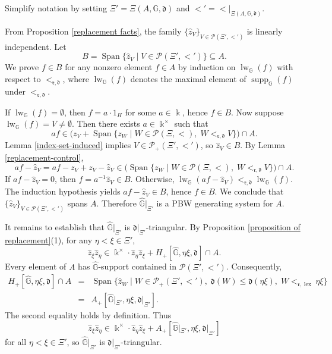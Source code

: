 \documentclass{article}
\makeatletter
\renewenvironment{proof}[1][\proofname]{\par
	\pushQED{\qed}%
	\normalfont \topsep6\p@\@plus6\p@\relax
	\trivlist
	\item[\hskip\labelsep
	\bfseries
	#1\@addpunct{.}]\ignorespaces
}{%
	\popQED\endtrivlist\@endpefalse
}
\theoremstyle{plain}
\theoremstyle{definition}
\numberwithin{equation}{section}
\DeclareMathOperator{\Span}{Span}
\DeclareMathOperator{\lex}{lex}
\DeclareMathOperator{\supp}{supp}
\newcommand{\GG}{\mathbb{G}}
\newcommand{\dd}{\mathfrak{d}}
\newcommand{\rr}{\mathfrak{r}}
\makeatother
\begin{document}
	\begin{proof}[Proof of Theorem \ref{PBW-sub-hereditary}]
		Simplify notation by setting $\Xi'=\Xi(A,\GG,\dd)$ and $<'={<}|_{\Xi(A,\GG,\dd)}$.
		
		From Proposition \ref{replacement facts}, the family $\{\hat{z}_{V}\}_{V\in \mathcal{P}(\Xi', <')}$ is linearly independent. Let $$B=\Span\{\hat{z}_{V}\mid V\in \mathcal{P}(\Xi', <')\}\subseteq A.$$ We prove $f\in B$ for any nonzero element $f\in A$ by induction on $\operatorname{lw}_{\GG}(f)$ with respect to $<_{\rr,\dd}$, where $\operatorname{lw}_{\GG}(f)$ denotes the maximal element of $\supp_{\GG}(f)$ under $<_{\rr,\dd}$.
		
		If $\operatorname{lw}_{\GG}(f)=\emptyset$, then $f=a\cdot 1_{H}$ for some $a\in \Bbbk$, hence $f\in B$. Now suppose $\operatorname{lw}_{\GG}(f)= V \neq \emptyset$. Then there exists $a\in \Bbbk^{\times}$ such that
		\[
		a f\in \big ( z_{V} + \Span\{z_{W} \mid W\in \mathcal{P}(\Xi, <),\; W<_{\rr,\dd} V\} \big) \cap A.
		\]
		Lemma \ref{index-set-induced} implies $V\in \mathcal{P}_{+}(\Xi', <')$, so $\hat{z}_{V}\in B$. By Lemma \ref{replacement-control},
		\[
		af - \hat{z}_{V} =af-z_{V} +z_{V}- \hat{z}_{V} \in \big ( \Span\{z_{W} \mid W\in \mathcal{P}(\Xi, <),\; W<_{\rr,\dd} V\} \big) \cap A.
		\]
		If $af - \hat{z}_{V}=0$, then $f= a^{-1}\hat{z}_{V}\in B$. Otherwise, $\operatorname{lw}_{\GG}(af - \hat{z}_{V})  <_{\rr,\dd} \operatorname{lw}_{\GG}(f)$. The induction hypothesis yields $af - \hat{z}_{V} \in B$, hence $f\in B$. We conclude that $\{\hat{z}_{V}\}_{V\in \mathcal{P}(\Xi', <')}$ spans $A$. Therefore $\hat{\GG}|_{\Xi'}$ is a PBW generating system for $A$.
		
		It remains to establish that $\hat{\GG}|_{\Xi'}$ is $\dd|_{\Xi'}$-triangular. By Proposition \ref{proposition of replacement}(1), for any $\eta<\xi\in\Xi'$,
		\[
		\hat{z}_\xi\hat{z}_\eta \in  \Bbbk^{\times}\cdot\hat{z}_\eta\hat{z}_\xi
		+ H_{+}[\hat{\GG},\eta\xi,\dd] \cap A.
		\]
		Every element of $A$ has $\hat{\GG}$-support contained in $\mathcal{P}(\Xi',<')$. Consequently,
		\begin{eqnarray*}
			H_{+}[\hat{\GG},\eta\xi,\dd] \cap A
			&=& \Span\{\hat{z}_{W}\mid W\in \mathcal{P}_{+}(\Xi', <'),\; \dd(W) \leq \dd(\eta\xi),\; W<_{\rr,\lex} \eta\xi\} \\
			&=& A_{+}[\hat{\GG}|_{\Xi'},\eta\xi,\dd|_{\Xi'}].
		\end{eqnarray*}
		The second equality holds by definition. Thus
		\[
		\hat{z}_\xi\hat{z}_\eta \in  \Bbbk^{\times}\cdot\hat{z}_\eta\hat{z}_\xi + A_{+}[\hat{\GG}|_{\Xi'},\eta\xi,\dd|_{\Xi'}]
		\]
		for all $\eta<\xi\in\Xi'$, so $\hat{\GG}|_{\Xi'}$ is $\dd|_{\Xi'}$-triangular.
	\end{proof}
	
\end{document}
